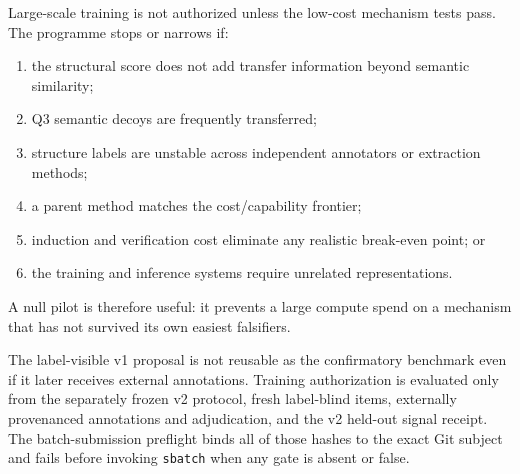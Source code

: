 Large-scale training is not authorized unless the low-cost mechanism tests pass. The programme stops or narrows if:
\begin{enumerate}[leftmargin=*]
\item the structural score does not add transfer information beyond semantic similarity;
\item Q3 semantic decoys are frequently transferred;
\item structure labels are unstable across independent annotators or extraction methods;
\item a parent method matches the cost/capability frontier;
\item induction and verification cost eliminate any realistic break-even point; or
\item the training and inference systems require unrelated representations.
\end{enumerate}

A null pilot is therefore useful: it prevents a large compute spend on a mechanism that has not survived its own easiest falsifiers.

The label-visible v1 proposal is not reusable as the confirmatory benchmark even
if it later receives external annotations.  Training authorization is evaluated
only from the separately frozen v2 protocol, fresh label-blind items, externally
provenanced annotations and adjudication, and the v2 held-out signal receipt.  The
batch-submission preflight binds all of those hashes to the exact Git subject and
fails before invoking \texttt{sbatch} when any gate is absent or false.
